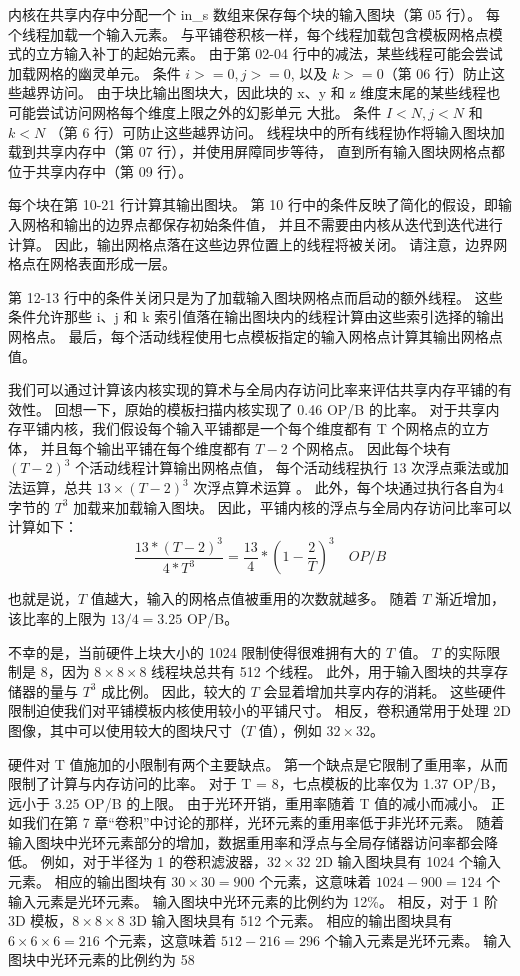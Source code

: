 内核在共享内存中分配一个 in\_s 数组来保存每个块的输入图块（第 05 行）。 每个线程加载一个输入元素。 
与平铺卷积核一样，每个线程加载包含模板网格点模式的立方输入补丁的起始元素。 
由于第 02-04 行中的减法，某些线程可能会尝试加载网格的幽灵单元。 
条件 $i >=0, j>= 0$, 以及 $k >= 0$（第 06 行）防止这些越界访问。 
由于块比输出图块大，因此块的 x、y 和 z 维度末尾的某些线程也可能尝试访问网格每个维度上限之外的幻影单元 大批。 
条件 $I < N, j < N$ 和 $k < N$ （第 6 行）可防止这些越界访问。 
线程块中的所有线程协作将输入图块加载到共享内存中（第 07 行），并使用屏障同步等待，
直到所有输入图块网格点都位于共享内存中（第 09 行）。

每个块在第 10-21 行计算其输出图块。 第 10 行中的条件反映了简化的假设，即输入网格和输出的边界点都保存初始条件值，
并且不需要由内核从迭代到迭代进行计算。 因此，输出网格点落在这些边界位置上的线程将被关闭。 
请注意，边界网格点在网格表面形成一层。

第 12-13 行中的条件关闭只是为了加载输入图块网格点而启动的额外线程。 
这些条件允许那些 i、j 和 k 索引值落在输出图块内的线程计算由这些索引选择的输出网格点。 
最后，每个活动线程使用七点模板指定的输入网格点计算其输出网格点值。

我们可以通过计算该内核实现的算术与全局内存访问比率来评估共享内存平铺的有效性。 
回想一下，原始的模板扫描内核实现了 0.46 OP/B 的比率。 
对于共享内存平铺内核，我们假设每个输入平铺都是一个每个维度都有 T 个网格点的立方体，
并且每个输出平铺在每个维度都有 $T - 2$ 个网格点。 
因此每个块有 $(T - 2)^3$ 个活动线程计算输出网格点值，
每个活动线程执行 13 次浮点乘法或加法运算，总共 $13 \times (T - 2)^3$ 次浮点算术运算 。 
此外，每个块通过执行各自为4字节的 $T^3$ 加载来加载输入图块。 因此，平铺内核的浮点与全局内存访问比率可以计算如下：
$$
\frac{13 *(T-2)^{3}}{4 * T^{3}}=\frac{13}{4} *\left(1-\frac{2}{T}\right)^{3} \quad O P / B
$$

也就是说，$T$ 值越大，输入的网格点值被重用的次数就越多。 随着 $T$ 渐近增加，该比率的上限为 $13/4 = 3.25$ OP/B。

不幸的是，当前硬件上块大小的 1024 限制使得很难拥有大的 $T$ 值。 
$T$ 的实际限制是 8，因为 $8 \times 8 \times 8$ 线程块总共有 512 个线程。 
此外，用于输入图块的共享存储器的量与 $T^3$ 成比例。 
因此，较大的 $T$ 会显着增加共享内存的消耗。 这些硬件限制迫使我们对平铺模板内核使用较小的平铺尺寸。 
相反，卷积通常用于处理 2D 图像，其中可以使用较大的图块尺寸（$T$ 值），例如 $32 \times 32$。

硬件对 T 值施加的小限制有两个主要缺点。 第一个缺点是它限制了重用率，从而限制了计算与内存访问的比率。 
对于 T = 8，七点模板的比率仅为 1.37 OP/B，远小于 3.25 OP/B 的上限。 由于光环开销，重用率随着 T 值的减小而减小。 
正如我们在第 7 章“卷积”中讨论的那样，光环元素的重用率低于非光环元素。 
随着输入图块中光环元素部分的增加，数据重用率和浮点与全局存储器访问率都会降低。 
例如，对于半径为 1 的卷积滤波器，$32 \times 32$ 2D 输入图块具有 1024 个输入元素。 
相应的输出图块有 $30 \times 30 = 900$ 个元素，这意味着 $1024 - 900 = 124$ 个输入元素是光环元素。 
输入图块中光环元素的比例约为 12\%。 相反，对于 1 阶 3D 模板，$8 \times 8 \times 8$ 3D 输入图块具有 512 个元素。 
相应的输出图块具有 $6 \times 6 \times 6 = 216$ 个元素，这意味着 $512 - 216 = 296$ 个输入元素是光环元素。 
输入图块中光环元素的比例约为 58%

